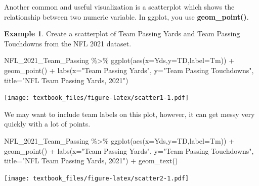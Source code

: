 \documentclass[
  11pt,
]{book}
\newenvironment{Shaded}{\begin{snugshade}}{\end{snugshade}}
\newcommand{\AttributeTok}[1]{\textcolor[rgb]{0.77,0.63,0.00}{#1}}
\newcommand{\FunctionTok}[1]{\textcolor[rgb]{0.00,0.00,0.00}{#1}}
\newcommand{\NormalTok}[1]{#1}
\newcommand{\SpecialCharTok}[1]{\textcolor[rgb]{0.00,0.00,0.00}{#1}}
\newcommand{\StringTok}[1]{\textcolor[rgb]{0.31,0.60,0.02}{#1}}
\theoremstyle{definition}
\theoremstyle{definition}
\newtheorem{example}{Example}[chapter]
\theoremstyle{definition}
\theoremstyle{definition}
\theoremstyle{remark}
\begin{document}
Another common and useful visualization is a scatterplot which shows the relationship between two numeric variable. In ggplot, you use \textbf{geom\_point()}.

\begin{example}
Create a scatterplot of Team Passing Yards and Team Passing Touchdowns from the NFL 2021 dataset.

\begin{Shaded}
\begin{Highlighting}[]
\NormalTok{NFL\_2021\_Team\_Passing }\SpecialCharTok{\%\textgreater{}\%}
  \FunctionTok{ggplot}\NormalTok{(}\FunctionTok{aes}\NormalTok{(}\AttributeTok{x=}\NormalTok{Yds,}\AttributeTok{y=}\NormalTok{TD,}\AttributeTok{label=}\NormalTok{Tm)) }\SpecialCharTok{+} 
  \FunctionTok{geom\_point}\NormalTok{() }\SpecialCharTok{+}
  \FunctionTok{labs}\NormalTok{(}\AttributeTok{x=}\StringTok{"Team Passing Yards"}\NormalTok{,}
       \AttributeTok{y=}\StringTok{"Team Passing Touchdowns"}\NormalTok{,}
       \AttributeTok{title=}\StringTok{"NFL Team Passing Yards, 2021"}\NormalTok{)}
\end{Highlighting}
\end{Shaded}

\texttt{[image: textbook\_files/figure-latex/scatter1-1.pdf]}

\vfill
\newpage

We may want to include team labels on this plot, however, it can get messy very quickly with a lot of points.

\begin{Shaded}
\begin{Highlighting}[]
\NormalTok{NFL\_2021\_Team\_Passing }\SpecialCharTok{\%\textgreater{}\%}
  \FunctionTok{ggplot}\NormalTok{(}\FunctionTok{aes}\NormalTok{(}\AttributeTok{x=}\NormalTok{Yds,}\AttributeTok{y=}\NormalTok{TD,}\AttributeTok{label=}\NormalTok{Tm)) }\SpecialCharTok{+} 
  \FunctionTok{geom\_point}\NormalTok{() }\SpecialCharTok{+}
  \FunctionTok{labs}\NormalTok{(}\AttributeTok{x=}\StringTok{"Team Passing Yards"}\NormalTok{,}
       \AttributeTok{y=}\StringTok{"Team Passing Touchdowns"}\NormalTok{,}
       \AttributeTok{title=}\StringTok{"NFL Team Passing Yards, 2021"}\NormalTok{) }\SpecialCharTok{+}
  \FunctionTok{geom\_text}\NormalTok{()}
\end{Highlighting}
\end{Shaded}

\texttt{[image: textbook\_files/figure-latex/scatter2-1.pdf]}

\vfill
\newpage


\end{example}
\end{document}
